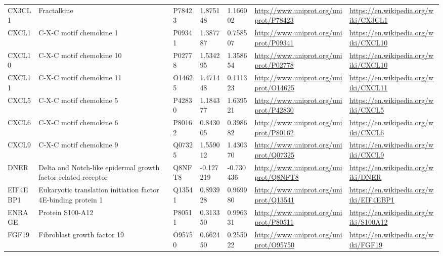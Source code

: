 \begin{table}[H]
{\begin{tabular}{ lllllll }
        \multicolumn{1}{l|}{ CX3CL1 } &  Fractalkine   & P78423   & 1.875148   & 1.166002   & \url{http://www.uniprot.org/uniprot/P78423}   & \url{https://en.wikipedia.org/wiki/CX3CL1}          \\ 
        \multicolumn{1}{l|}{ CXCL1 } &  C-X-C motif chemokine 1   & P09341   & 1.387787   & 0.758507   & \url{http://www.uniprot.org/uniprot/P09341}   & \url{https://en.wikipedia.org/wiki/CXCL10}          \\ 
        \multicolumn{1}{l|}{ CXCL10 } &  C-X-C motif chemokine 10   & P02778   & 1.534295   & 1.358654   & \url{http://www.uniprot.org/uniprot/P02778}   & \url{https://en.wikipedia.org/wiki/CXCL10}          \\ 
        \multicolumn{1}{l|}{ CXCL11 } &  C-X-C motif chemokine 11   & O14625   & 1.471448   & 0.111323   & \url{http://www.uniprot.org/uniprot/O14625}   & \url{https://en.wikipedia.org/wiki/CXCL11}          \\ 
        \multicolumn{1}{l|}{ CXCL5 } &  C-X-C motif chemokine 5   & P42830   & 1.184377   & 1.639521   & \url{http://www.uniprot.org/uniprot/P42830}   & \url{https://en.wikipedia.org/wiki/CXCL5}          \\ 
        \multicolumn{1}{l|}{ CXCL6 } &  C-X-C motif chemokine 6   & P80162   & 0.843005   & 0.398682   & \url{http://www.uniprot.org/uniprot/P80162}   & \url{https://en.wikipedia.org/wiki/CXCL6}          \\ 
        \multicolumn{1}{l|}{ CXCL9 } &  C-X-C motif chemokine 9   & Q07325   & 1.559012   & 1.430370   & \url{http://www.uniprot.org/uniprot/Q07325}   & \url{https://en.wikipedia.org/wiki/CXCL9}          \\ 
        \multicolumn{1}{l|}{ DNER } &  Delta and Notch-like epidermal growth factor-related receptor   & Q8NFT8   & -0.127219   & -0.730436   & \url{http://www.uniprot.org/uniprot/Q8NFT8}   & \url{https://en.wikipedia.org/wiki/DNER}          \\ 
        \multicolumn{1}{l|}{ EIF4EBP1 } &  Eukaryotic translation initiation factor 4E-binding protein 1   & Q13541   & 0.893928   & 0.969980   & \url{http://www.uniprot.org/uniprot/Q13541}   & \url{https://en.wikipedia.org/wiki/EIF4EBP1}          \\ 
        \multicolumn{1}{l|}{ ENRAGE } &  Protein S100-A12   & P80511   & 0.313350   & 0.996331   & \url{http://www.uniprot.org/uniprot/P80511}   & \url{https://en.wikipedia.org/wiki/S100A12}          \\ 
        \multicolumn{1}{l|}{ FGF19 } &  Fibroblast growth factor 19   & O95750   & 0.662450   & 0.255022   & \url{http://www.uniprot.org/uniprot/O95750}   & \url{https://en.wikipedia.org/wiki/FGF19}          \\ 

\end{tabular}}
\end{table}
